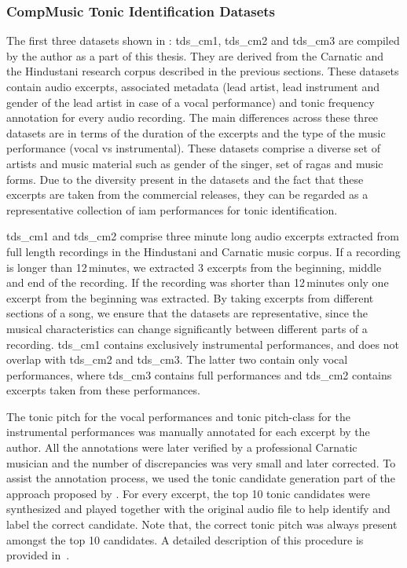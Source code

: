 {%


\subsubsection{CompMusic Tonic Identification Datasets}
\label{sec:corpus_compmusic_tonic_dataset}

The first three datasets shown in : \acrshort{tds_cm1}, \acrshort{tds_cm2} and \acrshort{tds_cm3} are compiled by the author as a part of this thesis. They are derived from the Carnatic and the Hindustani research corpus described in the previous sections. These datasets contain audio excerpts, associated metadata (lead artist, lead instrument and gender of the lead artist in case of a vocal performance) and tonic frequency annotation for every audio recording. The main differences across these three datasets are in terms of the duration of the excerpts and the type of the music performance (vocal vs instrumental). These datasets comprise a diverse set of artists and music material such as gender of the singer, set of \glspl{raga} and music forms. Due to the diversity present in the datasets and the fact that these excerpts are taken from the commercial releases, they can be regarded as a representative collection of \gls{iam} performances for tonic identification. 

\acrshort{tds_cm1} and \acrshort{tds_cm2} comprise three minute long audio excerpts extracted from full length recordings in the Hindustani and Carnatic music corpus. If a recording is longer than 12\,minutes, we extracted 3 excerpts from the beginning, middle and end of the recording. If the recording was shorter than 12\,minutes only one excerpt from the beginning was extracted. By taking excerpts from different sections of a song, we ensure that the datasets are representative, since the musical characteristics can change significantly between different parts of a recording. \acrshort{tds_cm1} contains exclusively instrumental performances, and does not overlap with \acrshort{tds_cm2} and \acrshort{tds_cm3}. The latter two contain only vocal performances, where \acrshort{tds_cm3} contains full performances and \acrshort{tds_cm2} contains excerpts taken from these performances. 

The tonic pitch for the vocal performances and tonic pitch-class for the instrumental performances was manually annotated for each excerpt by the author. All the annotations were later verified by a professional Carnatic musician and the number of discrepancies was very small and later corrected. To assist the annotation process, we used the tonic candidate generation part of the approach proposed by \cite{salamon2012multipitch}. For every excerpt, the top 10 tonic candidates were synthesized and played together with the original audio file to help identify and label the correct candidate. Note that, the correct tonic pitch was always present amongst the top 10 candidates. A detailed description of this procedure is provided in~\cite{SGulati_MThesis2012}.

}
